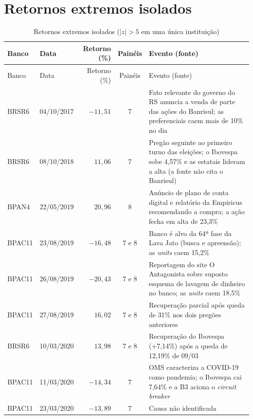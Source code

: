 \chapter{Retornos extremos isolados}
\label{ap:outliers}

   {\footnotesize
   \begin{longtable}{llrcp{7.2cm}}
   \caption{Retornos extremos isolados ($|z|>5$ em uma única instituição)}\label{tab:outliers}\\
   \toprule
   Banco & Data & Retorno (\%) & Painéis & Evento (fonte) \\
   \midrule
   \endfirsthead
   \toprule
   Banco & Data & Retorno (\%) & Painéis & Evento (fonte) \\
   \midrule
   \endhead
   \bottomrule
   \endfoot
BRSR6 & 04/10/2017 & $-11{,}51$ & 7 & Fato relevante do governo do RS anuncia a venda de parte das ações do Banrisul; as preferenciais caem mais de 10\% no dia \parencite{extraclasse2017, tribunapr2018} \\
BRSR6 & 08/10/2018 & $11{,}06$ & 7 & Pregão seguinte ao primeiro turno das eleições; o Ibovespa sobe 4,57\% e as estatais lideram a alta (a fonte não cita o Banrisul) \parencite{seudinheiro2018} \\
BPAN4 & 22/05/2019 & $20{,}96$ & 8 & Anúncio de plano de conta digital e relatório da Empiricus recomendando a compra; a ação fecha em alta de 23,3\% \parencite{seudinheiro2019pan} \\
BPAC11 & 23/08/2019 & $-16{,}48$ & 7 e 8 & Banco é alvo da 64ª fase da Lava Jato (busca e apreensão); as \textit{units} caem 15,2\% \parencite{moneytimes20190823} \\
BPAC11 & 26/08/2019 & $-20{,}43$ & 7 e 8 & Reportagem do site O Antagonista sobre suposto esquema de lavagem de dinheiro no banco; as \textit{units} caem 18,5\% \parencite{seudinheiro20190826} \\
BPAC11 & 27/08/2019 & $16{,}02$ & 7 e 8 & Recuperação parcial após queda de 31\% nos dois pregões anteriores \parencite{moneytimes20190827} \\
BRSR6 & 10/03/2020 & $13{,}98$ & 7 e 8 & Recuperação do Ibovespa (+7,14\%) após a queda de 12,19\% de 09/03 \parencite{suno20200311, infomoney2020cb} \\
BPAC11 & 11/03/2020 & $-14{,}34$ & 7 & OMS caracteriza a COVID-19 como pandemia; o Ibovespa cai 7,64\% e a B3 aciona o \textit{circuit breaker} \parencite{moneytimes20200311} \\
BPAC11 & 23/03/2020 & $-13{,}89$ & 7 & Causa não identificada \\

\end{longtable}}
